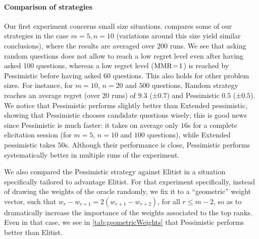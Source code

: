 \documentclass[runningheads]{llncs}
\theoremstyle{remark}
\begin{document}
\paragraph{Comparison of strategies}
Our first experiment concerns small size situations.
 compares some of our strategies in the case $m = 5, n = 10$ (variations around this size yield similar conclusions), where the results are averaged over $200$ runs.
We see that asking random questions does not allow to reach a low regret level even after having asked 100 questions, whereas a low regret level ($\operatorname{MMR} \!=\! 1$) is reached by Pessimistic before having asked 60 questions. This also holds for other problem sizes. For instance, for $m =10$, $n = 20$ and $500$ questions, Random strategy reaches an average regret (over 20 runs) of $9.3$ (±$ 0.7$) and Pessimistic $0.5$ (±$ 0.5$).
We notice that Pessimistic performs slightly better than Extended pessimistic, showing that Pessimistic chooses candidate questions wisely; this is good news since Pessimistic is much faster: it takes on average only $16$s for a complete elicitation session (for $m = 5$, $n = 10$ and $100$ questions), while Extended pessimistic takes $50$s. Although their performance is close, Pessimistic performs systematically better in multiple runs of the experiment.

We also compared the Pessimistic strategy against Elitist in a situation specifically tailored to advantage Elitist. For that experiment specifically, instead of drawing the weights of the oracle randomly, we fix it to a “geometric” weight vector, such that $w_r - w_{r + 1} = 2(w_{r + 1} - w_{r + 2})$, for all $r ≤ m - 2$, so as to dramatically increase the importance of the weights associated to the top ranks. Even in that case, we see in \cref{tab:geometricWeights} that Pessimistic performs better than Elitist.
\end{document}
